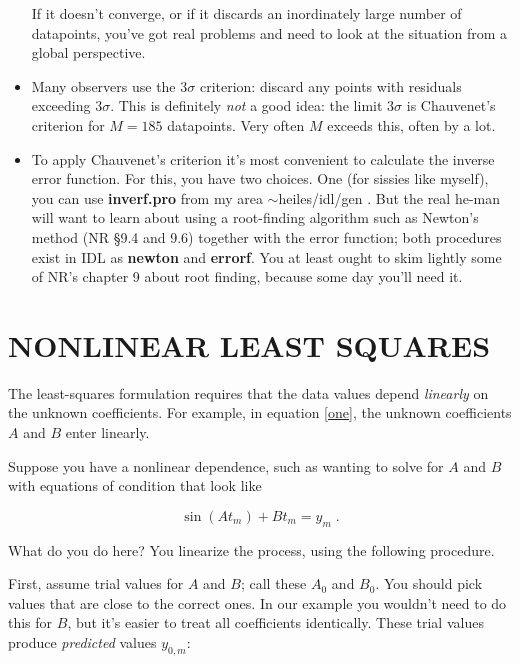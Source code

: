 \documentclass[psfig,preprint]{aastex}
\begin{document}
\begin{itemize}
	If it doesn't converge, or if it discards an inordinately large
number of datapoints, you've got real problems and need to look at the
situation from a global perspective.

	\item Many observers use the $3\sigma$ criterion: discard any
points with residuals exceeding $3\sigma$. This is definitely {\it not}
a good idea: the limit $3\sigma$ is Chauvenet's criterion for $M=185$
datapoints. Very often $M$ exceeds this, often by a lot. 

	\item To apply Chauvenet's criterion it's most convenient to
calculate the inverse error function. For this, you have two choices.
One (for sissies like myself), you can use {\bf inverf.pro} from my area
$\sim$heiles/idl/gen . But the real he-man will want to learn about
using a root-finding algorithm such as Newton's method (NR \S 9.4 and
9.6) together with the error function; both procedures exist in IDL as
{\bf newton} and {\bf errorf}. You at least ought to skim lightly some
of NR's chapter 9 about root finding, because some day you'll need it.

\end{itemize}

\section{NONLINEAR LEAST SQUARES} \label{nonlinearls}

	The least-squares formulation requires that the data values
depend {\it linearly} on the unknown coefficients. For example, in
equation \ref{one}, the unknown coefficients $A$ and $B$ enter linearly.

	Suppose you have a nonlinear dependence, such as wanting to
solve for $A$ and $B$ with equations of condition that look like 

\begin{equation} \label{basicone}
\sin(A t_m) + B t_m = y_m \; .
\end{equation}

\noindent What do you do here? You linearize the process, using the
following procedure. 

	First, assume trial values for $A$ and $B$; call these $A_0$
and $B_0$. You should pick values that are close to the correct ones. In
our example you wouldn't need to do this for $B$, but it's easier to
treat all coefficients identically. These trial values produce {\it
predicted} values $y_{0,m}$:
\end{document}
